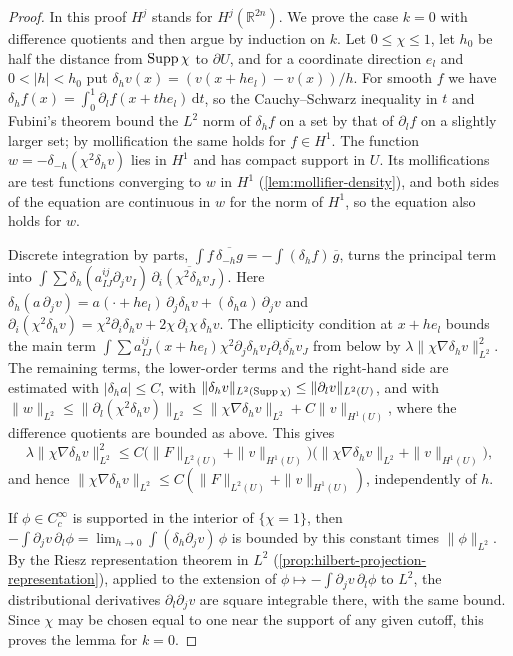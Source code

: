 \begin{proof}
In this proof $H^j$ stands for $H^j(\mathbb R^{2n})$. We prove the case $k=0$ with difference quotients and then argue by induction on $k$. Let $0\leq\chi\leq1$, let $h_0$ be half the distance from $\operatorname{Supp}\chi$ to $\partial U$, and for a coordinate direction $e_l$ and $0<|h|<h_0$ put $\delta_hv(x)=(v(x+he_l)-v(x))/h$. For smooth $f$ we have $\delta_hf(x)=\int_0^1\partial_lf(x+the_l)\,\mathrm dt$, so the Cauchy--Schwarz inequality in $t$ and Fubini's theorem bound the $L^2$ norm of $\delta_hf$ on a set by that of $\partial_lf$ on a slightly larger set; by mollification the same holds for $f\in H^1$. The function $w=-\delta_{-h}(\chi^2\delta_hv)$ lies in $H^1$ and has compact support in $U$. Its mollifications are test functions converging to $w$ in $H^1$ (\cref{lem:mollifier-density}), and both sides of the equation are continuous in $w$ for the norm of $H^1$, so the equation also holds for $w$.

Discrete integration by parts, $\int f\,\overline{\delta_{-h}g}=-\int(\delta_hf)\,\overline g$, turns the principal term into $\int\sum\delta_h(a^{ij}_{IJ}\partial_jv_I)\,\overline{\partial_i(\chi^2\delta_hv_J)}$. Here $\delta_h(a\,\partial_jv)=a(\cdot+he_l)\,\partial_j\delta_hv+(\delta_ha)\,\partial_jv$ and $\partial_i(\chi^2\delta_hv)=\chi^2\partial_i\delta_hv+2\chi\,\partial_i\chi\,\delta_hv$. The ellipticity condition at $x+he_l$ bounds the main term $\int\sum a^{ij}_{IJ}(x+he_l)\chi^2\partial_j\delta_hv_I\overline{\partial_i\delta_hv_J}$ from below by $\lambda\|\chi\nabla\delta_hv\|_{L^2}^2$. The remaining terms, the lower-order terms and the right-hand side are estimated with $|\delta_ha|\leq C$, with $\|\delta_hv\|_{L^2(\operatorname{Supp}\chi)}\leq\|\partial_lv\|_{L^2(U)}$, and with $\|w\|_{L^2}\leq\|\partial_l(\chi^2\delta_hv)\|_{L^2}\leq\|\chi\nabla\delta_hv\|_{L^2}+C\|v\|_{H^1(U)}$, where the difference quotients are bounded as above. This gives
\[
 \lambda\|\chi\nabla\delta_hv\|_{L^2}^2
 \leq C\bigl(\|F\|_{L^2(U)}+\|v\|_{H^1(U)}\bigr)
             \bigl(\|\chi\nabla\delta_hv\|_{L^2}+\|v\|_{H^1(U)}\bigr),
\]
and hence $\|\chi\nabla\delta_hv\|_{L^2}\leq C(\|F\|_{L^2(U)}+\|v\|_{H^1(U)})$, independently of $h$.

If $\phi\in C^\infty_c$ is supported in the interior of $\{\chi=1\}$, then $-\int\partial_jv\,\partial_l\phi=\lim_{h\to0}\int(\delta_h\partial_jv)\,\phi$ is bounded by this constant times $\|\phi\|_{L^2}$. By the Riesz representation theorem in $L^2$ (\cref{prop:hilbert-projection-representation}), applied to the extension of $\phi\mapsto-\int\partial_jv\,\partial_l\phi$ to $L^2$, the distributional derivatives $\partial_l\partial_jv$ are square integrable there, with the same bound. Since $\chi$ may be chosen equal to one near the support of any given cutoff, this proves the lemma for $k=0$.


\end{proof}
